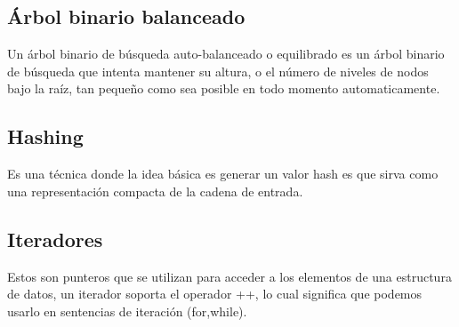 \subsection{Árbol binario balanceado}
Un árbol binario de búsqueda auto-balanceado o equilibrado es un árbol binario de búsqueda que intenta mantener su altura, o el número de niveles de nodos bajo la raíz, tan pequeño como sea posible en todo momento automaticamente.

\subsection{Hashing}
Es una técnica donde la idea básica es generar un valor hash es que sirva como una representación compacta de la cadena
de entrada.

\subsection{Iteradores}
Estos son punteros que se utilizan para acceder a los elementos de una estructura de datos, un iterador soporta el operador ++,
lo cual significa que podemos usarlo en sentencias de iteración (for,while).